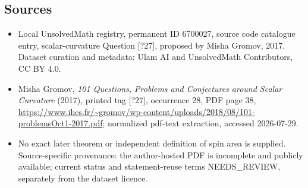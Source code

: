 \documentclass[11pt]{article}
\begin{document}
\subsection{Sources}
\begin{itemize}
\item Local UnsolvedMath registry, permanent ID 6700027, source code catalogue entry, scalar-curvature Question [?27], proposed by Misha Gromov, 2017. Dataset curation and metadata: Ulam AI and UnsolvedMath Contributors, CC BY 4.0.
\item Misha Gromov, \emph{101 Questions, Problems and Conjectures around Scalar Curvature} (2017), printed tag [?27], occurrence 28, PDF page 38, \url{https://www.ihes.fr/~gromov/wp-content/uploads/2018/08/101-problemsOct1-2017.pdf}; normalized pdf-text extraction, accessed 2026-07-29.
\item No exact later theorem or independent definition of spin area is supplied. Source-specific provenance: the author-hosted PDF is incomplete and publicly available; current status and statement-reuse terms NEEDS\_REVIEW, separately from the dataset licence.
\end{itemize}
\end{document}
